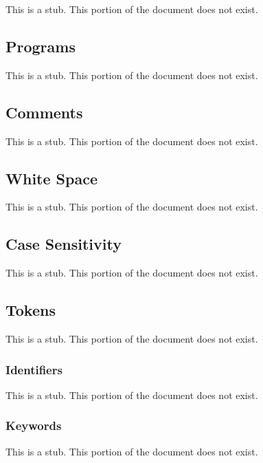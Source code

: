 \label{Lexical_Structure}

This is a stub.  This portion of the document does not exist.

\subsection{Programs}
\label{Programs}

This is a stub.  This portion of the document does not exist.

\subsection{Comments}
\label{Comments}

This is a stub.  This portion of the document does not exist.

\subsection{White Space}
\label{White_Space}

This is a stub.  This portion of the document does not exist.

\subsection{Case Sensitivity}
\label{Case_Sensitivity}

This is a stub.  This portion of the document does not exist.

\subsection{Tokens}
\label{Tokens}

This is a stub.  This portion of the document does not exist.

\subsubsection{Identifiers}
\label{Identifiers}

This is a stub.  This portion of the document does not exist.

\subsubsection{Keywords}
\label{Keywords}

This is a stub.  This portion of the document does not exist.

